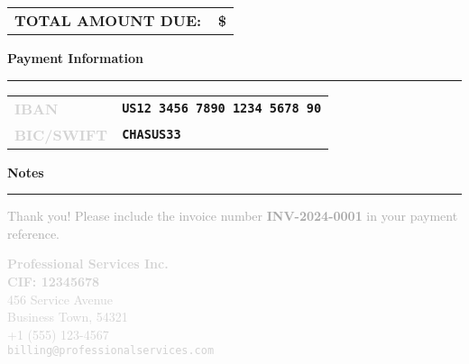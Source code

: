 \documentclass[11pt,a4paper]{article}
\makeatletter
\newcommand{\companyname}{Professional Services Inc.}
\newcommand{\companycif}{CIF: 12345678}
\newcommand{\companystreet}{456 Service Avenue}
\newcommand{\companycity}{Business Town, 54321}
\newcommand{\companyphone}{+1 (555) 123-4567}
\newcommand{\companyemail}{billing@professionalservices.com}
\newcommand{\invoicenumber}{INV-2024-0001}
\newcommand{\companyiban}{US12 3456 7890 1234 5678 90}
\newcommand{\companybic}{CHASUS33}
\newcommand{\currencysymbol}{\$}
\def\totalamount{0}
\newcommand{\formatcurrency}[1]{%
    \fpeval{round(#1, 2)}\,\currencysymbol%
}
\newcommand{\sectionskip}{\vspace{0.8cm}}
\newcommand{\itemskip}{\vspace{0.5cm}}
\newcommand{\blockskip}{\vspace{0.3cm}}
\newlength{\smallgap}
\newcommand{\layoutlabel}[1]{\textbf{\textcolor{lightgray}{\footnotesize\MakeUppercase{#1}}}}
\newcommand{\primarytext}[1]{\textcolor{primaryblue}{#1}}
\newcommand{\emphasizedtext}[1]{\textbf{\primarytext{#1}}}
\newcommand{\sectionheader}[1]{%
    \noindent%
    {\Large\emphasizedtext{#1}}%
    \par\vspace{-0.2cm}%
    \noindent%
    \primarytext{\rule{\textwidth}{0.8pt}}%
    \blockskip%
}
\newcommand{\displaytotal}{%
    \begin{flushright}
        \begin{tabular}{lr}
            \large\emphasizedtext{TOTAL AMOUNT DUE:} & 
            {\Large\emphasizedtext{\formatcurrency{\totalamount}}} \\
        \end{tabular}
    \end{flushright}
}
\makeatother
\begin{document}
\displaytotal

\blockskip

\sectionheader{Payment Information}

\begin{tabular}{@{}p{3cm}l@{}}
    \layoutlabel{IBAN} & \texttt{\textbf{\companyiban}} \\[\smallgap]
    \layoutlabel{BIC/SWIFT} & \texttt{\textbf{\companybic}} \\[\smallgap]
\end{tabular}

\itemskip

\sectionheader{Notes}

\textcolor{darkgray}{%
\small Thank you! Please include the invoice number \textbf{\invoicenumber} in your payment reference.}

\sectionskip

\begin{center}
    {\small\textcolor{lightgray}{%
        \textbf{\companyname} \\ \textbf{\companycif} \\ \companystreet \\ \companycity \\ \companyphone \\ \texttt{\companyemail}
    }}
\end{center}
\end{document}

